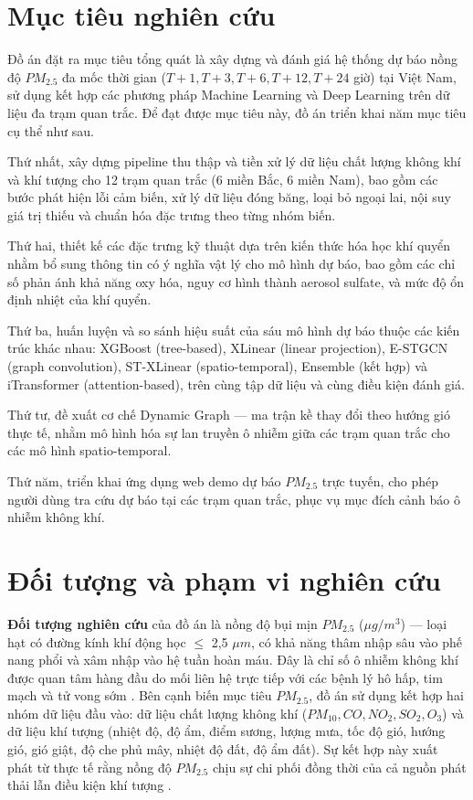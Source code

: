 \section{Mục tiêu nghiên cứu}

Đồ án đặt ra mục tiêu tổng quát là xây dựng và đánh giá hệ thống dự báo nồng độ $PM_{2.5}$ đa mốc thời gian ($T+1, T+3, T+6, T+12, T+24$ giờ) tại Việt Nam, sử dụng kết hợp các phương pháp Machine Learning và Deep Learning trên dữ liệu đa trạm quan trắc. Để đạt được mục tiêu này, đồ án triển khai năm mục tiêu cụ thể như sau.

Thứ nhất, xây dựng pipeline thu thập và tiền xử lý dữ liệu chất lượng không khí và khí tượng cho 12 trạm quan trắc (6 miền Bắc, 6 miền Nam), bao gồm các bước phát hiện lỗi cảm biến, xử lý dữ liệu đóng băng, loại bỏ ngoại lai, nội suy giá trị thiếu và chuẩn hóa đặc trưng theo từng nhóm biến. 

Thứ hai, thiết kế các đặc trưng kỹ thuật dựa trên kiến thức hóa học khí quyển nhằm bổ sung thông tin có ý nghĩa vật lý cho mô hình dự báo, bao gồm các chỉ số phản ánh khả năng oxy hóa, nguy cơ hình thành aerosol sulfate, và mức độ ổn định nhiệt của khí quyển. 

Thứ ba, huấn luyện và so sánh hiệu suất của sáu mô hình dự báo thuộc các kiến trúc khác nhau: XGBoost (tree-based), XLinear (linear projection), E-STGCN (graph convolution), ST-XLinear (spatio-temporal), Ensemble (kết hợp) và iTransformer (attention-based), trên cùng tập dữ liệu và cùng điều kiện đánh giá. 

Thứ tư, đề xuất cơ chế Dynamic Graph --- ma trận kề thay đổi theo hướng gió thực tế, nhằm mô hình hóa sự lan truyền ô nhiễm giữa các trạm quan trắc cho các mô hình spatio-temporal. 

Thứ năm, triển khai ứng dụng web demo dự báo $PM_{2.5}$ trực tuyến, cho phép người dùng tra cứu dự báo tại các trạm quan trắc, phục vụ mục đích cảnh báo ô nhiễm không khí.

\section{Đối tượng và phạm vi nghiên cứu}

\textbf{Đối tượng nghiên cứu} của đồ án là nồng độ bụi mịn $PM_{2.5}$ ($\mu g/m^3$) --- loại hạt có đường kính khí động học $\leq$ 2,5 $\mu m$, có khả năng thâm nhập sâu vào phế nang phổi và xâm nhập vào hệ tuần hoàn máu. Đây là chỉ số ô nhiễm không khí được quan tâm hàng đầu do mối liên hệ trực tiếp với các bệnh lý hô hấp, tim mạch và tử vong sớm \cite{le2024environmental}. Bên cạnh biến mục tiêu $PM_{2.5}$, đồ án sử dụng kết hợp hai nhóm dữ liệu đầu vào: dữ liệu chất lượng không khí ($PM_{10}, CO, NO_2, SO_2, O_3$) và dữ liệu khí tượng (nhiệt độ, độ ẩm, điểm sương, lượng mưa, tốc độ gió, hướng gió, gió giật, độ che phủ mây, nhiệt độ đất, độ ẩm đất). Sự kết hợp này xuất phát từ thực tế rằng nồng độ $PM_{2.5}$ chịu sự chi phối đồng thời của cả nguồn phát thải lẫn điều kiện khí tượng \cite{dam2024pm25}.


